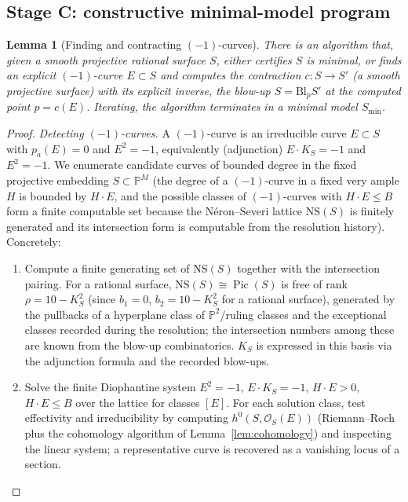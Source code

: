 \documentclass{amsart}
\theoremstyle{plain}
\newtheorem{lemma}{Lemma}
\theoremstyle{definition}
\newcommand{\PP}{\mathbb{P}}
\newcommand{\cO}{\mathcal{O}}
\DeclareMathOperator{\Pic}{Pic}
\begin{document}
\subsection{Stage C: constructive minimal-model program}

\begin{lemma}[Finding and contracting $(-1)$-curves]\label{lem:mmp}
There is an algorithm that, given a smooth projective rational surface $S$,
either certifies $S$ is minimal, or finds an explicit $(-1)$-curve $E\subset S$
and computes the contraction $c\colon S\to S'$ (a smooth projective surface) with
its explicit inverse, the blow-up $S=\mathrm{Bl}_{p}S'$ at the computed point
$p=c(E)$.  Iterating, the algorithm terminates in a minimal model $S_{\min}$.
\end{lemma}

\begin{proof}
\emph{Detecting $(-1)$-curves.}  A $(-1)$-curve is an irreducible curve
$E\subset S$ with $p_a(E)=0$ and $E^2=-1$, equivalently (adjunction)
$E\cdot K_S=-1$ and $E^2=-1$.  We enumerate candidate curves of bounded degree
in the fixed projective embedding $S\subset\PP^M$ (the degree of a $(-1)$-curve
in a fixed very ample $H$ is bounded by $H\cdot E$, and the possible classes of
$(-1)$-curves with $H\cdot E\le B$ form a finite computable set because the
N\'eron--Severi lattice $\mathrm{NS}(S)$ is finitely generated and its
intersection form is computable from the resolution history).  Concretely:
\begin{enumerate}
\item Compute a finite generating set of $\mathrm{NS}(S)$ together with the
intersection pairing.  For a rational surface, $\mathrm{NS}(S)\cong
\Pic(S)$ is free of rank $\rho=10-K_S^2$ (since $b_1=0$, $b_2=10-K_S^2$ for a
rational surface), generated by the pullbacks of a hyperplane class of
$\PP^2$/ruling classes and the exceptional classes recorded during the
resolution; the intersection numbers among these are known from the blow-up
combinatorics.  $K_S$ is expressed in this basis via the adjunction formula and
the recorded blow-ups.
\item Solve the finite Diophantine system $E^2=-1$, $E\cdot K_S=-1$, $H\cdot
E>0$, $H\cdot E\le B$ over the lattice for classes $[E]$.  For each solution
class, test effectivity and irreducibility by computing
$h^0(S,\cO_S(E))$ (Riemann--Roch plus the cohomology algorithm of
Lemma~\ref{lem:cohomology}) and inspecting the linear system; a representative
curve is recovered as a vanishing locus of a section.
\end{enumerate}

\end{proof}
\end{document}
